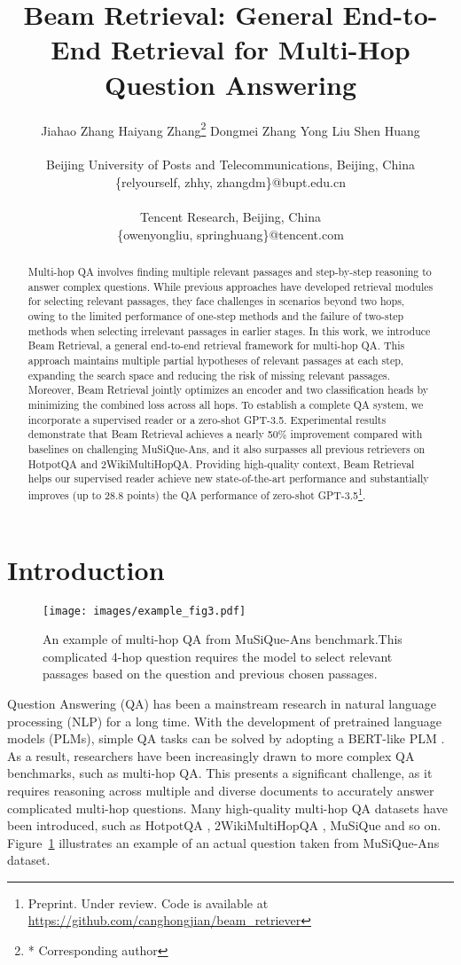 \documentclass[10.5pt]{article}
\title{Beam Retrieval: General End-to-End Retrieval for Multi-Hop Question Answering}
\author{
  Jiahao Zhang\textsuperscript{\rm \dag} \quad
  Haiyang Zhang\textsuperscript{\rm \dag}\thanks{* Corresponding author} \quad
  Dongmei Zhang\textsuperscript{\rm \dag} \quad
  Yong Liu\textsuperscript{\rm \ddag}\quad
  Shen Huang\textsuperscript{\rm \ddag}\\
  \\
  \textsuperscript{\rm \dag}Beijing University of Posts and Telecommunications, Beijing, China \\
  \small \textsuperscript{}{\{relyourself, zhhy, zhangdm\}@bupt.edu.cn} \\
  \\
  \textsuperscript{\rm \ddag}Tencent Research, Beijing, China \\
  \small \textsuperscript{}{\{owenyongliu, springhuang\}@tencent.com}
}
\begin{document}
\maketitle

\begin{abstract}
Multi-hop QA involves finding multiple relevant passages and step-by-step reasoning to answer complex questions. While previous approaches have developed retrieval modules for selecting relevant passages, they face challenges in scenarios beyond two hops, owing to the limited performance of one-step methods and the failure of two-step methods when selecting irrelevant passages in earlier stages. In this work, we introduce Beam Retrieval, a general end-to-end retrieval framework for multi-hop QA. This approach maintains  multiple partial hypotheses of relevant passages at each step, expanding the search space and reducing the risk of missing relevant passages. Moreover, Beam Retrieval jointly optimizes an encoder and two classification heads by minimizing the combined loss across all hops. To establish a complete QA system, we incorporate a supervised reader or a zero-shot GPT-3.5.  Experimental results demonstrate that Beam Retrieval achieves a nearly 50\% improvement compared with baselines on challenging MuSiQue-Ans, and it also surpasses all previous retrievers on HotpotQA and 2WikiMultiHopQA. Providing high-quality context, Beam Retrieval helps our supervised reader achieve new state-of-the-art performance and substantially improves (up to 28.8 points) the QA performance of zero-shot GPT-3.5\footnote{Preprint. Under review. Code is available at \url{https://github.com/canghongjian/beam_retriever}}.
\end{abstract}

\section{Introduction}

\begin{figure}[!t]
  \centering
  \texttt{[image: images/example\_fig3.pdf]}
  \caption{An example of multi-hop QA from MuSiQue-Ans benchmark.This complicated 4-hop question requires the model to select relevant passages based on the question and previous chosen passages.}
  \label{fig:examples}
\end{figure}

Question Answering (QA) has been a mainstream research in natural language processing (NLP) for a long time. With the development of pretrained language models (PLMs), simple QA tasks can be solved by adopting a BERT-like PLM \cite{devlin-etal-2019-bert}. As a result, researchers have been increasingly drawn to more complex QA benchmarks, such as multi-hop QA. This presents a significant challenge, as it requires reasoning across multiple and diverse documents to accurately answer complicated multi-hop questions. Many high-quality multi-hop QA datasets have been introduced, such as HotpotQA \cite{yang-etal-2018-hotpotqa}, 2WikiMultiHopQA \cite{DBLP:journals/corr/abs-2011-01060} , MuSiQue \cite{musique} and so on. Figure~\ref{fig:examples} illustrates an example of an actual question taken from MuSiQue-Ans dataset.
\end{document}
